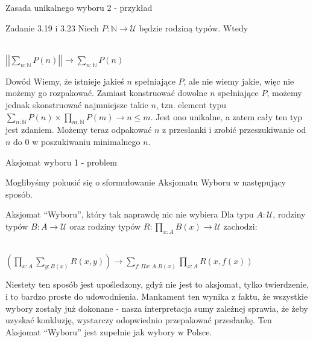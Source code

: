 \documentclass{beamer}
\newcommand{\U}{\mathcal{U}}
\begin{document}
\begin{frame}{Zasada unikalnego wyboru 2 - przykład}
	
\begin{block}{Zadanie 3.19 i 3.23}
Niech $P : \mathbb{N} \to \U$ będzie rodziną typów. Wtedy \\~\

\begin{center}
$\displaystyle \left|\left|\sum_{n : \mathbb{N}} P(n)\right|\right| \to \sum_{n : \mathbb{N}} P(n)$
\end{center}
\end{block}

\begin{block}{Dowód}
Wiemy, że istnieje jakieś $n$ spełniające $P$, ale nie wiemy jakie, więc nie możemy go rozpakować. Zamiast konstruować dowolne $n$ spełniające $P$, możemy jednak skonstruować najmniejsze takie $n$, tzn. element typu $\sum_{n : \mathbb{N}} P(n) \times \prod_{m : \mathbb{N}} P(m) \to n \leq m$. Jest ono unikalne, a zatem cały ten typ jest zdaniem. Możemy teraz odpakować $n$ z przesłanki i zrobić przeszukiwanie od $n$ do $0$ w poszukiwaniu minimalnego $n$.
\end{block}

\end{frame}

\begin{frame}{Aksjomat wyboru 1 - problem}

Moglibyśmy pokusić się o sformułowanie Aksjomatu Wyboru w następujący sposób.

\begin{block}{Aksjomat ``Wyboru'', który tak naprawdę nic nie wybiera}
Dla typu $A : \U$, rodziny typów $B : A \to \U$ oraz rodziny typów $R : \prod_{x : A} B(x) \to \U$ zachodzi: \\~\

$\displaystyle
	\left(\prod_{x : A} \sum_{y : B(x)} R(x, y)\right) \to
	\sum_{f : \Pi x : A. B(x)} \prod_{x : A} R(x, f(x))
$
\end{block}

Niestety ten sposób jest upośledzony, gdyż nie jest to aksjomat, tylko twierdzenie, i to bardzo proste do udowodnienia. Mankament ten wynika z faktu, że wszystkie wybory zostały już dokonane - nasza interpretacja sumy zależnej sprawia, że żeby uzyskać konkluzję, wystarczy odopwiednio przepakować przesłankę. Ten Aksjomat ``Wyboru'' jest zupełnie jak wybory w Polsce.

\end{frame}
\end{document}
